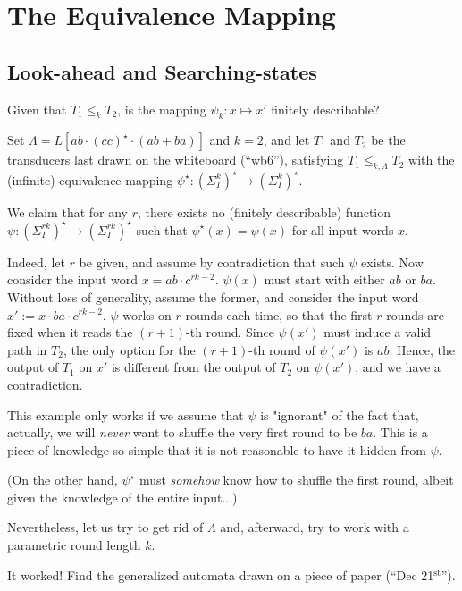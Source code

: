 \chapter{The Equivalence Mapping}
\label{chap:equiv_mapping}

\section{Look-ahead and Searching-states}

Given that $T_1 \leq_k T_2$, is the mapping $\psi_k: x\mapsto x'$ finitely describable?

\begin{example}

Set $\Lambda=L[ab\cdot (cc)^\star\cdot (ab+ba)]$ and $k=2$, and let $T_1$ and $T_2$ be the transducers last drawn on the whiteboard (``wb6''), satisfying $T_1\leq_{k,\Lambda} T_2$ with the (infinite) equivalence mapping $\psi^\star: (\Sigma_I^k)^\star \rightarrow (\Sigma_I^k)^\star$.

We claim that for any $r$, there exists no (finitely describable) function $\psi: (\Sigma_I^{rk})^\star \rightarrow (\Sigma_I^{rk})^\star$ such that $\psi^\star(x)=\psi(x)$ for all input words $x$.

Indeed, let $r$ be given, and assume by contradiction that such $\psi$ exists. Now consider the input word $x=ab\cdot c^{rk-2}$. $\psi(x)$ must start with either $ab$ or $ba$. Without loss of generality, assume the former, and consider the input word $x':=x\cdot ba\cdot c^{rk-2}$. $\psi$ works on $r$ rounds each time, so that the first $r$ rounds are fixed when it reads the $(r+1)$-th round. Since $\psi(x')$ must induce a valid path in $T_2$, the only option for the $(r+1)$-th round of $\psi(x')$ is $ab$. Hence, the output of $T_1$ on $x'$ is different from the output of $T_2$ on $\psi(x')$, and we have a contradiction.

This example only works if we assume that $\psi$ is "ignorant" of the fact that, actually, we will \emph{never} want to shuffle the very first round to be $ba$. This is a piece of knowledge so simple that it is not reasonable to have it hidden from $\psi$.

(On the other hand, $\psi^\star$ must \emph{somehow} know how to shuffle the first round, albeit given the knowledge of the entire input...)

Nevertheless, let us try to get rid of $\Lambda$ and, afterward, try to work with a parametric round length $k$.

It worked! Find the generalized automata drawn on a piece of paper (``Dec 21$^\text{st}$''). \qedsymbol

\end{example}

